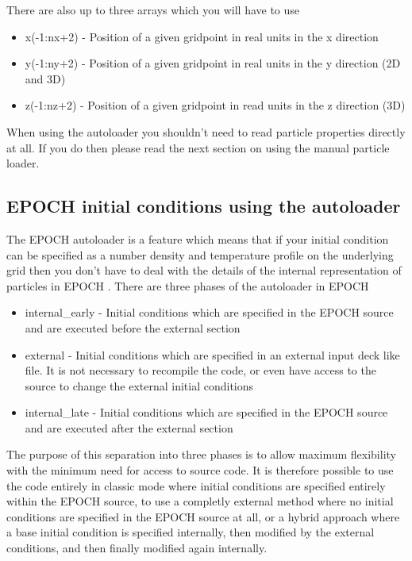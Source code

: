 \documentclass[12pt]{article}
\newcommand{\EPOCH}{{\color{warwickdark}\fontfamily{phv}\selectfont EPOCH} }
\begin{document}
There are also up to three arrays which you will have to use
\begin{itemize}
\item x(-1:nx+2) - Position of a given gridpoint in real units in the x
  direction
\item y(-1:ny+2) - Position of a given gridpoint in real units in the y
  direction (2D and 3D)
\item z(-1:nz+2) - Position of a given gridpoint in read units in the z
  direction (3D)
\end{itemize}

When using the autoloader you shouldn't need to read particle properties
directly at all. If you do then please read the next section on using the
manual particle loader.

\subsection{\EPOCH initial conditions using the autoloader}
The \EPOCH autoloader is a feature which means that if your initial condition
can be specified as a number density and temperature profile on the underlying
grid then you don't have to deal with the details of the internal
representation of particles in \EPOCH. There are three phases of the
autoloader in EPOCH

\begin{itemize}
\item internal\_early - Initial conditions which are specified in the \EPOCH
  source and are executed before the external section
\item external - Initial conditions which are specified in an external input
  deck like file. It is not necessary to recompile the code, or even have
  access to the source to change the external initial conditions
\item internal\_late - Initial conditions which are specified in the \EPOCH
  source and are executed after the external section
\end{itemize}

The purpose of this separation into three phases is to allow maximum
flexibility with the minimum need for access to source code. It is therefore
possible to use the code entirely in classic mode where initial conditions are
specified entirely within the \EPOCH source, to use a completly external
method where no initial conditions are specified in the \EPOCH source at all,
or a hybrid approach where a base initial condition is specified internally,
then modified by the external conditions, and then finally modified again
internally.
\end{document}
